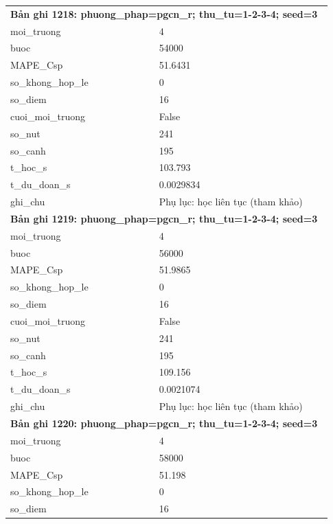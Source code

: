 \begin{longtable}{p{0.43\linewidth}p{0.50\linewidth}}
\midrule
\multicolumn{2}{p{0.95\linewidth}}{\textbf{Bản ghi 1218: phuong\_phap=pgcn\_r; thu\_tu=1-2-3-4; seed=3}} \\
moi\_\allowbreak truong & 4 \\
buoc & 54000 \\
MAPE\_\allowbreak Csp & 51.6431 \\
so\_\allowbreak khong\_\allowbreak hop\_\allowbreak le & 0 \\
so\_\allowbreak diem & 16 \\
cuoi\_\allowbreak moi\_\allowbreak truong & False \\
so\_\allowbreak nut & 241 \\
so\_\allowbreak canh & 195 \\
t\_\allowbreak hoc\_\allowbreak s & 103.793 \\
t\_\allowbreak du\_\allowbreak doan\_\allowbreak s & 0.0029834 \\
ghi\_\allowbreak chu & Phụ lục: học liên tục (tham khảo) \\
\midrule
\multicolumn{2}{p{0.95\linewidth}}{\textbf{Bản ghi 1219: phuong\_phap=pgcn\_r; thu\_tu=1-2-3-4; seed=3}} \\
moi\_\allowbreak truong & 4 \\
buoc & 56000 \\
MAPE\_\allowbreak Csp & 51.9865 \\
so\_\allowbreak khong\_\allowbreak hop\_\allowbreak le & 0 \\
so\_\allowbreak diem & 16 \\
cuoi\_\allowbreak moi\_\allowbreak truong & False \\
so\_\allowbreak nut & 241 \\
so\_\allowbreak canh & 195 \\
t\_\allowbreak hoc\_\allowbreak s & 109.156 \\
t\_\allowbreak du\_\allowbreak doan\_\allowbreak s & 0.0021074 \\
ghi\_\allowbreak chu & Phụ lục: học liên tục (tham khảo) \\
\midrule
\multicolumn{2}{p{0.95\linewidth}}{\textbf{Bản ghi 1220: phuong\_phap=pgcn\_r; thu\_tu=1-2-3-4; seed=3}} \\
moi\_\allowbreak truong & 4 \\
buoc & 58000 \\
MAPE\_\allowbreak Csp & 51.198 \\
so\_\allowbreak khong\_\allowbreak hop\_\allowbreak le & 0 \\
so\_\allowbreak diem & 16 \\

\end{longtable}
